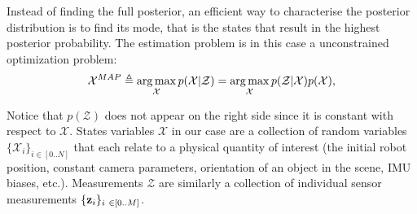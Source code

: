 Instead of finding the full posterior, an efficient way to characterise the posterior distribution is to find its mode, that is the states that 
result in the highest posterior probability. The estimation problem is in this case a unconstrained optimization problem:
%
\begin{equation}
    \label{eq:MAP_pbe}
    \mathcal{X}^{MAP} \triangleq \operatorname*{arg\,max}_{\mathcal{X}} p(\mathcal{X} | \mathcal{Z}) = \operatorname*{arg\,max}_{\mathcal{X}} p(\mathcal{Z} | \mathcal{X}) p(\mathcal{X}),
\end{equation}
%

Notice that $p(\mathcal{Z})$ does not appear on the right side since it is constant with respect to $\mathcal{X}$.
States variables $\mathcal{X}$ in our case are a collection of random variables $\{\mathcal{X}_i\}_{i \in [0..N]}$ that each relate to a physical quantity of 
interest (\eg the initial robot position, constant camera parameters, orientation of an object in the scene, IMU biases, etc.). Measurements $\mathcal{Z}$ are 
similarly a collection of individual sensor measurements $\{\bfz_i\}_{i \in [0..M]}$.

